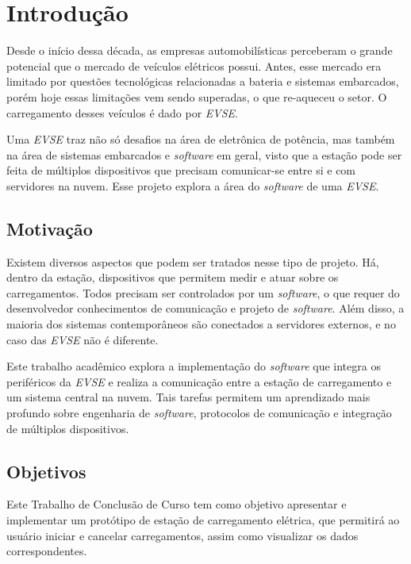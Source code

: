 \chapter{Introdução}
\label{stateofart:intro}

  Desde o início dessa década, as empresas automobilísticas perceberam o grande potencial que o mercado de veículos elétricos possui. Antes, esse mercado era limitado por questões tecnológicas relacionadas a bateria e sistemas embarcados, porém hoje essas limitações vem sendo superadas, o que re-aqueceu o setor. O carregamento desses veículos é dado por \textit{\ac{EVSE}}.

  Uma \textit{\ac{EVSE}} traz não só desafios na área de eletrônica de potência, mas também na área de sistemas embarcados e \textit{software} em geral, visto que a estação pode ser feita de múltiplos dispositivos que precisam comunicar-se entre si e com servidores na nuvem. Esse projeto explora a área do \textit{software} de uma \textit{\ac{EVSE}}.

  \section{Motivação}
  \label{stateofart:intro:motivation}

    Existem diversos aspectos que podem ser tratados nesse tipo de projeto. Há, dentro da estação, dispositivos que permitem medir e atuar sobre os carregamentos. Todos precisam ser controlados por um \textit{software}, o que requer do desenvolvedor conhecimentos de comunicação e projeto de \textit{software}. Além disso, a maioria dos sistemas contemporâneos são conectados a servidores externos, e no caso das \textit{\ac{EVSE}} não é diferente.

    Este trabalho acadêmico explora a implementação do \textit{software} que integra os periféricos da \textit{\ac{EVSE}} e realiza a comunicação entre a estação de carregamento e um sistema central na nuvem. Tais tarefas permitem um aprendizado mais profundo sobre engenharia de \textit{software}, protocolos de comunicação e integração de múltiplos dispositivos.

  \section{Objetivos}
  \label{stateofart:intro:objectives}

    Este Trabalho de Conclusão de Curso tem como objetivo apresentar e implementar um protótipo de estação de carregamento elétrica, que permitirá ao usuário iniciar e cancelar carregamentos, assim como visualizar os dados correspondentes.

